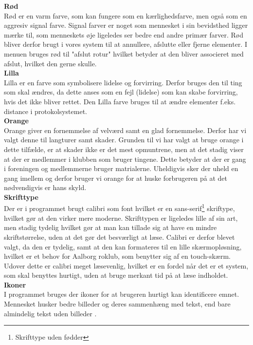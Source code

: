 {\bf Rød}\\
Rød er en varm farve, som kan fungere som en kærlighedsfarve, men også som en aggresiv signal farve. Signal farver er noget som mennesket i sin bevidsthed ligger mærke til, som menneskets øje ligeledes ser bedre end andre primær farver. Rød bliver derfor brugt i vores system til at annullere, afslutte eller fjerne elementer. I menuen bruges rød til "afslut rotur" hvilket betyder at den bliver associeret med afslut, hvilket den gerne skulle.\\

{\bf Lilla}\\
Lilla er en farve som symbolisere lidelse og forvirring. Derfor bruges den til ting som skal ændres, da dette anses som en fejl (lidelse) som kan skabe forvirring, hvis det ikke bliver rettet. Den Lilla farve bruges til at ændre elementer f.eks. distance i protokolsystemet.\\ 

{\bf Orange}\\
Orange giver en fornemmelse af velværd samt en glad fornemmelse. Derfor har vi valgt denne til langturer samt skader. Grunden til vi har valgt at bruge orange i dette tilfælde, er at skader ikke er det mest opmuntrene, men at det stadig viser at der er medlemmer i klubben som bruger tingene. Dette betyder at der er gang i foreningen og medlemmerne bruger matrialerne. Uheldigvis sker der uheld en gang imellem og derfor bruger vi orange for at huske forbrugeren på at det nødvendigvis er hans skyld. \cite{design_farver}\\
                                    

\textbf{Skrifttype}\\
Der er i programmet brugt calibri som font hvilket er en sans-serif\footnote{Skrifttype uden fødder} skriftype, hvilket gør at den virker mere moderne. Skrifttypen er ligeledes lille af sin art, men stadig tydelig hvilket gør at man kan tillade sig at have en mindre skriftstørrelse, uden at det gør det besværligt at læse. Calibri er derfor blevet valgt, da den er tydelig, samt at den kan formateres til en lille skærmopløsning, hvilket er et behov for Aalborg roklub, som benytter sig af en touch-skærm. Udover dette er calibri meget læsevenlig, hvilket er en fordel når det er et system, som skal benyttes hurtigt, uden at bruge merkant tid på at læse indholdet.\\

\textbf{Ikoner}\\
I programmet bruges der ikoner for at brugeren hurtigt kan identificere emnet. Mennesket husker bedre billeder og deres sammenhæng med tekst, end bare almindelig tekst uden billeder \cite{design_hukommelsen}.\\

